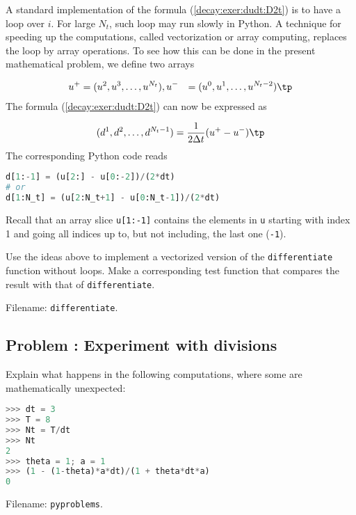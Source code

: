 \documentclass[graybox,sectrefs,envcountresetchap,open=right,final]{svmonodo}
\newenvironment{doconceexercise}{}{}
\newcounter{doconceexercisecounter}
\begin{document}
\begin{doconceexercise}
A standard implementation of the formula (\ref{decay:exer:dudt:D2t}) is to
have a loop over $i$. For large $N_t$, such loop may run slowly in
Python. A technique for speeding up the computations, called vectorization
or array computing,
replaces the loop by array operations. To see how this can be done in
the present mathematical problem, we
define two arrays

\begin{align*}
u^+ &= (u^2,u^3,\ldots,u^{N_t}),
u^- &= (u^0,u^1,\ldots,u^{N_t-2})\tp
\end{align*}
The formula (\ref{decay:exer:dudt:D2t}) can now be expressed as

\[ (d^1,d^2,\ldots,d^{N_t-1}) = \frac{1}{2\Delta t}(u^+ - u^-)\tp\]
The corresponding Python code reads

\begin{lstlisting}[language=Python,style=blue1_bluegreen]
d[1:-1] = (u[2:] - u[0:-2])/(2*dt)
# or
d[1:N_t] = (u[2:N_t+1] - u[0:N_t-1])/(2*dt)
\end{lstlisting}
Recall that an array slice \texttt{u[1:-1]} contains the elements in \texttt{u} starting
with index 1 and going all indices up to, but not including, the last one
(\texttt{-1}).

Use the ideas above to implement a vectorized version of the
\texttt{differentiate} function without loops. Make a corresponding
test function that compares the result with that of
\texttt{differentiate}.



\noindent Filename: \texttt{differentiate}.

\end{doconceexercise}




\begin{doconceexercise}

\subsection*{Problem \thedoconceexercisecounter: Experiment with divisions}

\label{decay:exer:intdiv}

Explain what happens in the following computations, where
some are mathematically unexpected:

\begin{lstlisting}[language=Python,style=blue1_bluegreen]
>>> dt = 3
>>> T = 8
>>> Nt = T/dt
>>> Nt
2
>>> theta = 1; a = 1
>>> (1 - (1-theta)*a*dt)/(1 + theta*dt*a)
0
\end{lstlisting}


\noindent Filename: \texttt{pyproblems}.

\end{doconceexercise}
\end{document}

